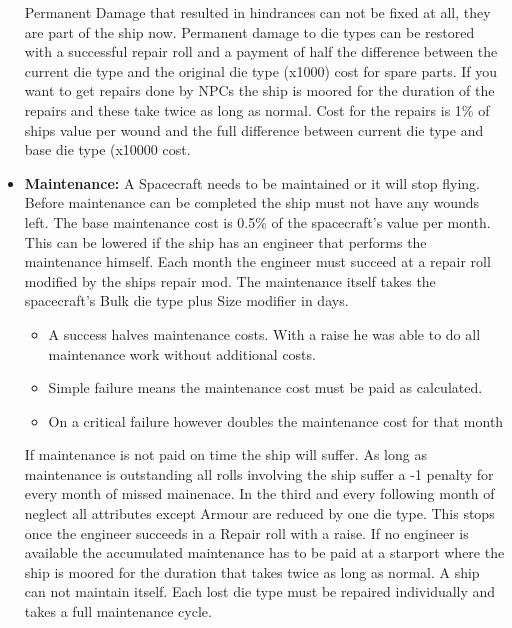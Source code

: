 \begin{multicols}{2}
\begin{itemize}
\begin{itemize}
  \end{itemize}
  Permanent Damage that resulted in hindrances can not be fixed at all, they are part of the ship now. Permanent damage to die types can be restored with a successful repair roll and a payment of half the difference between the current die type and the original die type (x1000) cost for spare parts. If you want to get repairs done by NPCs the ship is moored for the duration of the repairs and these take twice as long as normal. Cost for the repairs is 1\% of ships value per wound and the full difference between current die type and base die type (x10000 cost.
  \item \textbf{Maintenance:} A Spacecraft needs to be maintained or it will stop flying. Before maintenance can be completed the ship must not have any wounds left. The base maintenance cost is 0.5\% of the spacecraft's value per month. This can be lowered if the ship has an engineer that performs the maintenance himself. Each month the engineer must succeed at a repair roll modified by the ships repair mod. The maintenance itself takes the spacecraft's Bulk die type plus Size modifier in days. 
  \begin{itemize}
    \item A success halves maintenance costs. With a raise he was able to do all maintenance work without additional costs.
    \item Simple failure means the maintenance cost must be paid as calculated.
    \item On a critical failure however doubles the maintenance cost for that month
  \end{itemize}
  If maintenance is not paid on time the ship will suffer. As long as maintenance is outstanding all rolls involving the ship suffer a -1
penalty for every month of missed mainenace. In the third and every following month of neglect all attributes except Armour are reduced by one die type. This stops once the engineer succeeds in a Repair roll with a raise. If no engineer is available the accumulated maintenance has to be paid at a starport where the ship is moored for the duration that takes twice as long as normal. A ship can not maintain itself. Each lost die type must be repaired individually and takes a full maintenance cycle.
\end{itemize}


\end{multicols}

